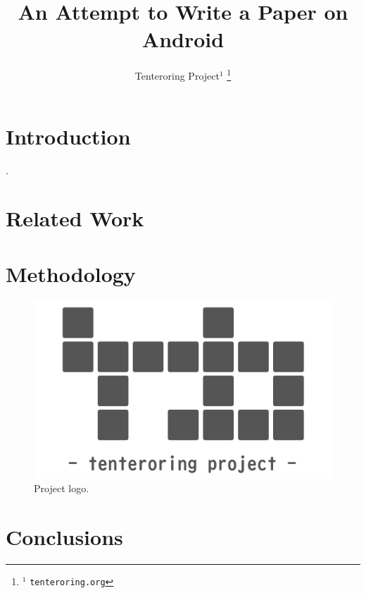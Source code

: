 \documentclass[letterpaper, 10 pt, conference]{ieeeconf}  %
\title{\LARGE \bf
An Attempt to Write a Paper on Android
}
\author{Tenteroring Project$^{1}$%
\thanks{$^{1}$ {\tt\small tenteroring.org}}%
}
\begin{document}
\maketitle
\thispagestyle{empty}
\pagestyle{empty}

\begin{abstract}

\lipsum[1]

\end{abstract}


\section{Introduction}

\cite{tenteroring}.

\lipsum[2]

\section{Related Work}

\lipsum[3]

\section{Methodology}

\begin{figure}[tb]
  \centering
  \includegraphics[width=1.0\linewidth]{logo2.pdf}
  \caption{Project logo.}
\end{figure}

\lipsum[5-6]

\section{Conclusions}

\lipsum[7]




\end{document}
